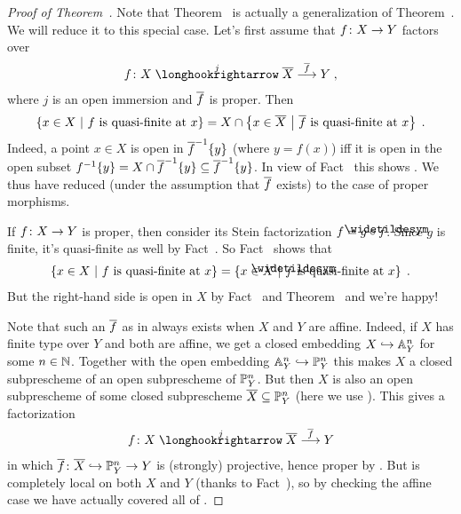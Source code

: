 \documentclass[a4paper,parskip=half,numbers=enddot, DIV=12]{scrreprt}
\begin{document}
\begin{proof}[Proof of Theorem~]
	Note that Theorem~ is actually a generalization of Theorem~. We will reduce it to this special case.	Let's first assume that $f\colon X\morphism Y$ factors over
	\begin{align}\lbl{eq:properCompactification}
		f\colon X\monomorphism[j]\ov{X}\morphism[\smash{\ov{f}}]Y\;,
	\end{align}
	where $j$ is an open immersion and $\overline{f}$ is proper. Then
	\begin{align}\lbl{eq:fandfbar}
		\left\{x\in X\st f\text{ is quasi-finite at }x\right\}=X\cap \left\{x\in \ov{X}\st \ov{f}\text{ is quasi-finite at }x\right\}\;.
	\end{align}
	Indeed, a point $x\in X$ is open in $\overline{f}^{-1}\{y\}$ (where $y=f(x)$) iff it is open in the open subset $f^{-1}\{y\}=X\cap \overline{f}^{-1}\{y\}\subseteq \overline{f}^{-1}\{y\}$. In view of Fact~ this shows . We thus have reduced  (under the assumption that $\overline{f}$ exists) to the case of proper morphisms. 
	
	If $f\colon X\morphism Y$ is proper, then consider its Stein factorization $f=g\circ \snake{f}$. Since $g$ is finite, it's quasi-finite as well by Fact~. So Fact~ shows that
	\begin{align*}
		\left\{x\in X\st f\text{ is quasi-finite at }x\right\}=\left\{x\in X\st \snake{f}\text{ is quasi-finite at }x\right\}\;.
	\end{align*}
	But the right-hand side is open in $X$ by Fact~ and Theorem~ and we're happy!
	
	Note that such an $\overline{f}$ as in  always exists when $X$ and $Y$ are affine. Indeed, if $X$ has finite type over $Y$ and both are affine, we get a closed embedding $X\monomorphism\IA_Y^n$ for some $n\in \mathbb{N}$. Together with the open embedding $\IA_Y^n\monomorphism\IP_Y^n$ this makes $X$ a closed subprescheme of an open subprescheme of $\mathbb{P}_Y^n$. But then $X$ is also an open subprescheme of some closed subprescheme $\overline{X}\subseteq \mathbb{P}_Y^n$ (here we use \cite[]{stacks-project}). This gives a factorization
	\begin{align*}
		f\colon X\monomorphism[j]\ov{X}\morphism[\smash{\ov{f}}]Y
	\end{align*}
	in which $\ov{f}\colon \ov{X}\monomorphism \IP_Y^n\morphism Y$ is (strongly) projective, hence proper by \cite[Proposition~2.4.2]{alggeo2}. But  is completely local on both $X$ and $Y$ (thanks to Fact~), so by checking the affine case we have actually covered all of . 
\end{proof}
\end{document}
